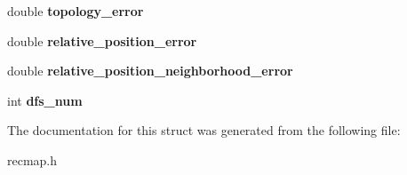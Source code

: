 \begin{DoxyCompactItemize}
double {\bfseries topology\+\_\+error}
\item 
\mbox{\label{structcrecmap_1_1map__region_a83e9ccaa7694718d4dfa6c8c2f2593ef}} 
double {\bfseries relative\+\_\+position\+\_\+error}
\item 
\mbox{\label{structcrecmap_1_1map__region_aed781775ed47c4af24b3c2a76f232f46}} 
double {\bfseries relative\+\_\+position\+\_\+neighborhood\+\_\+error}
\item 
\mbox{\label{structcrecmap_1_1map__region_a80f4d9d2679093cc81fac7a0bbc8c2b2}} 
int {\bfseries dfs\+\_\+num}
\end{DoxyCompactItemize}


The documentation for this struct was generated from the following file\+:\begin{DoxyCompactItemize}
\item 
recmap.\+h\end{DoxyCompactItemize}
